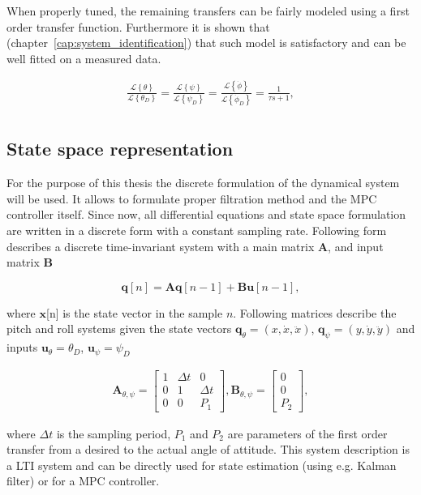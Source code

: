 When properly tuned, the remaining transfers can be fairly modeled using a first order transfer function. Furthermore it is shown that (chapter~\ref{cap:system_identification}) that such model is satisfactory and can be well fitted on a measured data.

\begin{equation}
\begin{split}
\frac{\mathcal{L}\left\lbrace \theta \right\rbrace}{\mathcal{L}\left\lbrace \theta_D \right\rbrace} = \frac{\mathcal{L}\left\lbrace \psi \right\rbrace}{\mathcal{L}\left\lbrace \psi_D \right\rbrace} = \frac{\mathcal{L}\left\lbrace \dot{\phi} \right\rbrace}{\mathcal{L}\left\lbrace \dot{\phi}_D \right\rbrace} = \frac{1}{\tau s + 1},\\
\end{split}
\end{equation}

\subsection{State space representation}

For the purpose of this thesis the discrete formulation of the dynamical system will be used. It allows to formulate proper filtration method and the MPC controller itself. Since now, all differential equations and state space formulation are written in a discrete form with a constant sampling rate. Following form describes a discrete time-invariant system with a main matrix $\mathbf{A}$, and input matrix $\mathbf{B}$

\begin{equation}
\mathbf{q}[n] = \mathbf{A}\mathbf{q}[n-1]+ \mathbf{B}\mathbf{u}[n-1],
\end{equation}

where $\mathbf{x}$[n] is the state vector in the sample $n$. Following matrices describe the pitch and roll systems given the state vectors $\mathbf{q}_{\theta} = \left(x, \dot{x}, \ddot{x}\right)$, $\mathbf{q}_{\psi} = \left(y, \dot{y}, \ddot{y}\right)$ and inputs $\mathbf{u}_\theta = \theta_D$, $\mathbf{u}_\psi = \psi_D$

\begin{equation}
\begin{split}
\mathbf{A}_{\theta, \psi} = \begin{bmatrix}
1 & \Delta t & 0 \\
0 & 1 & \Delta t \\
0 & 0 & P_1
\end{bmatrix}, \mathbf{B}_{\theta, \psi} = \begin{bmatrix}
0\\
0\\
P_2
\end{bmatrix},
\end{split}
\end{equation}

where $\Delta t$ is the sampling period, $P_1$ and $P_2$ are parameters of the first order transfer from a desired to the actual angle of attitude. This system description is a LTI system and can be directly used for state estimation (using e.g. Kalman filter) or for a MPC controller.